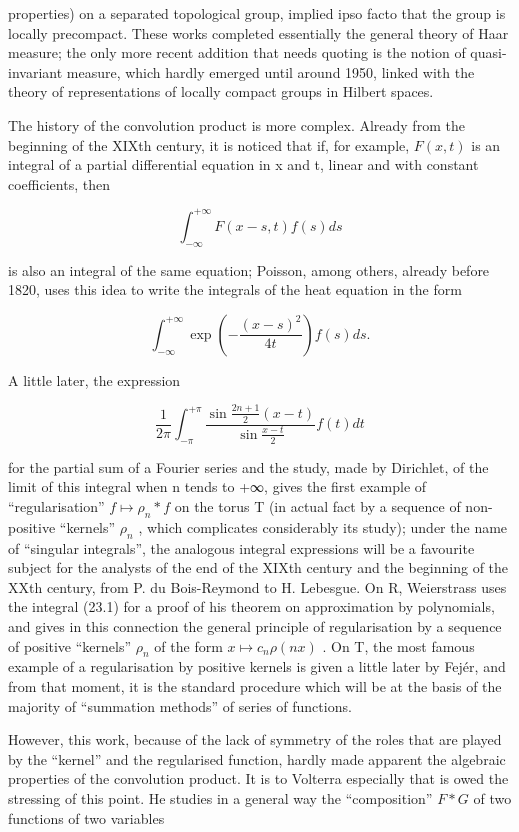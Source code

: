 properties) on a separated topological group, implied ipso facto that the group is locally precompact. These works completed essentially the general theory of Haar measure; the only more recent addition that needs quoting is the notion of quasi-invariant measure, which hardly emerged until around 1950, linked with the theory of representations of locally compact groups in Hilbert spaces.

The history of the convolution product is more complex. Already from the beginning of the XIXth century, it is noticed that if, for example, \(F(x,t)\) is an integral of a partial differential equation in x and t, linear and with constant coefficients, then

\[
\int_ {- \infty} ^ {+ \infty} F (x - s, t) f (s) d s
\]

is also an integral of the same equation; Poisson, among others, already before 1820, uses this idea to write the integrals of the heat equation in the form

\[
\int_ {- \infty} ^ {+ \infty} \exp \left(- \frac {(x - s) ^ {2}}{4 t}\right) f (s) d s.\tag{23.1}
\]

A little later, the expression

\[
\frac {1}{2 \pi} \int_ {- \pi} ^ {+ \pi} \frac {\sin \frac {2 n + 1}{2} (x - t)}{\sin \frac {x - t}{2}} f (t) d t\tag{23.2}
\]

for the partial sum of a Fourier series and the study, made by Dirichlet, of the limit of this integral when n tends to +∞, gives the first example of ``regularisation'' \(f \mapsto \rho_{n} * f\) on the torus T (in actual fact by a sequence of non-positive ``kernels'' \(\rho_{n}\) , which complicates considerably its study); under the name of ``singular integrals'', the analogous integral expressions will be a favourite subject for the analysts of the end of the XIXth century and the beginning of the XXth century, from P. du Bois-Reymond to H. Lebesgue. On R, Weierstrass uses the integral (23.1) for a proof of his theorem on approximation by polynomials, and gives in this connection the general principle of regularisation by a sequence of positive ``kernels'' \(\rho_{n}\) of the form \(x \mapsto c_{n} \rho(nx)\) . On T, the most famous example of a regularisation by positive kernels is given a little later by Fejér, and from that moment, it is the standard procedure which will be at the basis of the majority of ``summation methods'' of series of functions.

However, this work, because of the lack of symmetry of the roles that are played by the ``kernel'' and the regularised function, hardly made apparent the algebraic properties of the convolution product. It is to Volterra especially that is owed the stressing of this point. He studies in a general way the ``composition'' \(F * G\) of two functions of two variables

